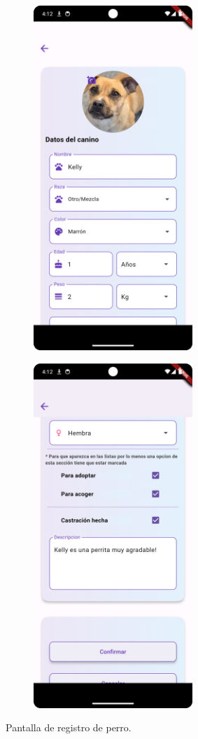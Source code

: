\documentclass[a4paper, 12pt]{article}
\begin{document}
\begin{figure}[H]
   	\begin{subfigure}{0.48\textwidth}
		\begin{center}
			{\includegraphics[width=6cm]{app/RegisterDog1.png}\par}
		\end{center}  
	\end{subfigure}\hfill
   	\begin{subfigure}{0.48\textwidth}
		\begin{center}
			{\includegraphics[width=6cm]{app/RegisterDog2.png}\par}
		\end{center}  
	\end{subfigure}\hfill
	\caption{Pantalla de registro de perro.}
\end{figure}
\end{document}
